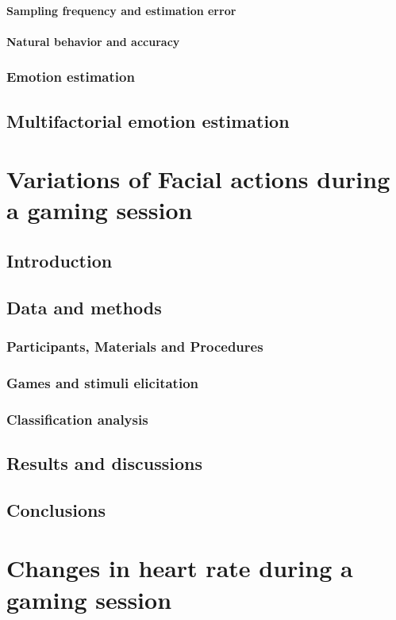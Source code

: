       \subsubsection{Sampling frequency and estimation error}
      \subsubsection{Natural behavior and accuracy}
    \subsection{Emotion estimation}
  \section{Multifactorial emotion estimation}

\chapter{Variations of Facial actions during a gaming session}
  \section{Introduction}
  \section{Data and methods}
    \subsection{Participants, Materials and Procedures}
    \subsection{Games and stimuli elicitation}
    \subsection{Classification analysis}
  \section{Results and discussions}
  \section{Conclusions}

\chapter{Changes in heart rate during a gaming session}
